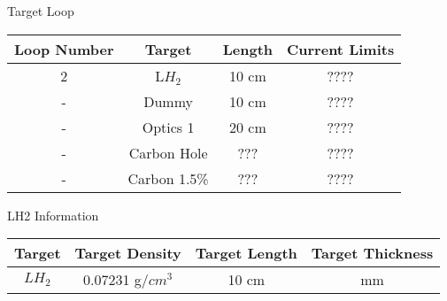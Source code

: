 \begin{Mtable}{Target Loop}
  \centering
  \begin{tabular}{|c|c|c|c|}
    \hline
    \textbf{Loop Number} & \textbf{Target} & \textbf{Length} & \textbf{Current Limits} \\
    \hline
    2 & L$H_2$ & 10 cm & ???? \\
    - & Dummy & 10 cm  & ???? \\
    - & Optics 1 & 20 cm  & ???? \\
    - & Carbon Hole & ???  & ???? \\
    - & Carbon 1.5\% & ???  & ???? \\
    \hline
    \end{tabular}
  \caption{Break down of all targets available during the running period. The three cryogenic targets are labeled alongside their corresponding loops. The target length is also provided for each type.}
  \label{tab:2-3_target_loop}
\end{Mtable}

\begin{Mtable}{LH2 Information}
  \centering
  \begin{tabular}{|c|c|c|c|}
    \hline
    \textbf{Target} & \textbf{Target Density} & \textbf{Target Length} & \textbf{Target Thickness} \\
    \hline
    $LH_2$ & 0.07231 g/$cm^3$ & 10 cm & mm \\
    \hline
    \end{tabular}
  \label{tab:2-3_lh2_properties}
\end{Mtable}

%
%

